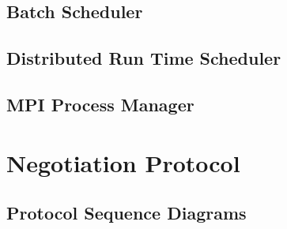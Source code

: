 \subsection{Batch Scheduler}
\subsection{Distributed Run Time Scheduler}
\subsection{MPI Process Manager}


\section{Negotiation Protocol}
\subsection{Protocol Sequence Diagrams}
\vspace{-0.15in}
